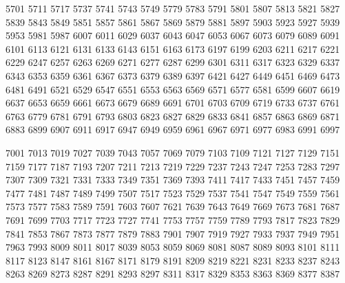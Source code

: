     \vfill
    
    5701
    5711
    5717
    5737
    5741
    5743
    5749
    5779
    5783
    5791
    5801
    5807
    5813
    5821
    5827
    5839
    5843
    5849
    5851
    5857
    5861
    5867
    5869
    5879
    5881
    5897
    5903
    5923
    5927
    5939
    5953
    5981
    5987
    6007
    6011
    6029
    6037
    6043
    6047
    6053
    6067
    6073
    6079
    6089
    6091
    6101
    6113
    6121
    6131
    6133
    6143
    6151
    6163
    6173
    6197
    6199
    6203
    6211
    6217
    6221
    6229
    6247
    6257
    6263
    6269
    6271
    6277
    6287
    6299
    6301
    6311
    6317
    6323
    6329
    6337
    6343
    6353
    6359
    6361
    6367
    6373
    6379
    6389
    6397
    6421
    6427
    6449
    6451
    6469
    6473
    6481
    6491
    6521
    6529
    6547
    6551
    6553
    6563
    6569
    6571
    6577
    6581
    6599
    6607
    6619
    6637
    6653
    6659
    6661
    6673
    6679
    6689
    6691
    6701
    6703
    6709
    6719
    6733
    6737
    6761
    6763
    6779
    6781
    6791
    6793
    6803
    6823
    6827
    6829
    6833
    6841
    6857
    6863
    6869
    6871
    6883
    6899
    6907
    6911
    6917
    6947
    6949
    6959
    6961
    6967
    6971
    6977
    6983
    6991
    6997
    
    \vfill
    
    7001
    7013
    7019
    7027
    7039
    7043
    7057
    7069
    7079
    7103
    7109
    7121
    7127
    7129
    7151
    7159
    7177
    7187
    7193
    7207
    7211
    7213
    7219
    7229
    7237
    7243
    7247
    7253
    7283
    7297
    7307
    7309
    7321
    7331
    7333
    7349
    7351
    7369
    7393
    7411
    7417
    7433
    7451
    7457
    7459
    7477
    7481
    7487
    7489
    7499
    7507
    7517
    7523
    7529
    7537
    7541
    7547
    7549
    7559
    7561
    7573
    7577
    7583
    7589
    7591
    7603
    7607
    7621
    7639
    7643
    7649
    7669
    7673
    7681
    7687
    7691
    7699
    7703
    7717
    7723
    7727
    7741
    7753
    7757
    7759
    7789
    7793
    7817
    7823
    7829
    7841
    7853
    7867
    7873
    7877
    7879
    7883
    7901
    7907
    7919
    7927
    7933
    7937
    7949
    7951
    7963
    7993
    8009
    8011
    8017
    8039
    8053
    8059
    8069
    8081
    8087
    8089
    8093
    8101
    8111
    8117
    8123
    8147
    8161
    8167
    8171
    8179
    8191
    8209
    8219
    8221
    8231
    8233
    8237
    8243
    8263
    8269
    8273
    8287
    8291
    8293
    8297
    8311
    8317
    8329
    8353
    8363
    8369
    8377
    8387
    
